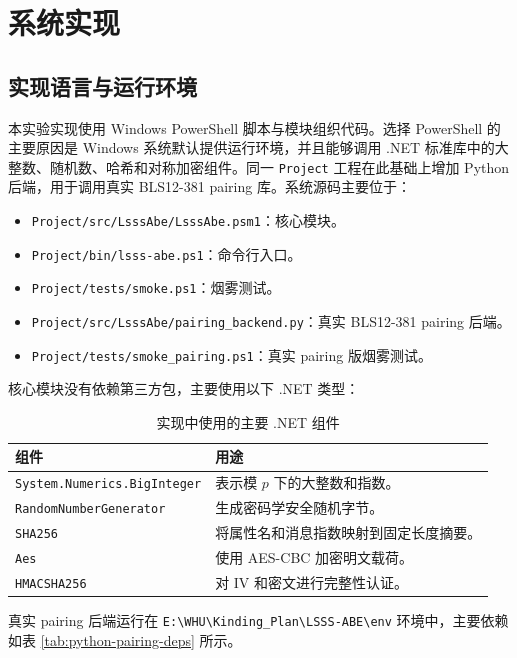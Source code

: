 \chapter{系统实现}

\section{实现语言与运行环境}

本实验实现使用 Windows PowerShell 脚本与模块组织代码。选择 PowerShell 的主要原因是 Windows 系统默认提供运行环境，并且能够调用 .NET 标准库中的大整数、随机数、哈希和对称加密组件。同一 \verb|Project| 工程在此基础上增加 Python 后端，用于调用真实 BLS12-381 pairing 库。系统源码主要位于：

\begin{itemize}
    \item \verb|Project/src/LsssAbe/LsssAbe.psm1|：核心模块。
    \item \verb|Project/bin/lsss-abe.ps1|：命令行入口。
    \item \verb|Project/tests/smoke.ps1|：烟雾测试。
    \item \verb|Project/src/LsssAbe/pairing_backend.py|：真实 BLS12-381 pairing 后端。
    \item \verb|Project/tests/smoke_pairing.ps1|：真实 pairing 版烟雾测试。
\end{itemize}

核心模块没有依赖第三方包，主要使用以下 .NET 类型：

\begin{table}[H]
\centering
\caption{实现中使用的主要 .NET 组件}
\begin{tabular}{p{} p{}}
\toprule
组件 & 用途 \\
\midrule
\verb|System.Numerics.BigInteger| & 表示模 $p$ 下的大整数和指数。\\
\verb|RandomNumberGenerator| & 生成密码学安全随机字节。\\
\verb|SHA256| & 将属性名和消息指数映射到固定长度摘要。\\
\verb|Aes| & 使用 AES-CBC 加密明文载荷。\\
\verb|HMACSHA256| & 对 IV 和密文进行完整性认证。\\
\bottomrule
\end{tabular}
\end{table}

真实 pairing 后端运行在 \verb|E:\WHU\Kinding_Plan\LSSS-ABE\env| 环境中，主要依赖如表 \ref{tab:python-pairing-deps} 所示。

